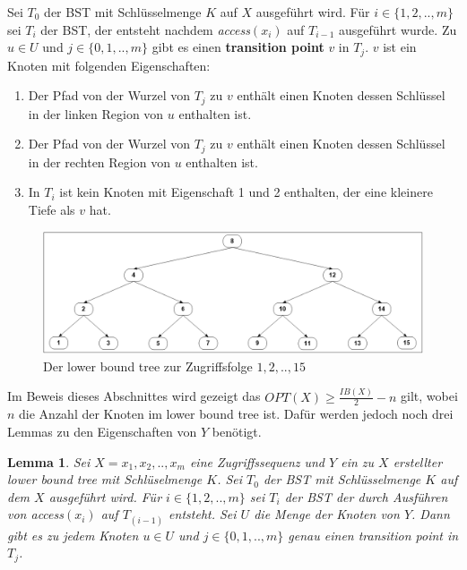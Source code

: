 \documentclass[a4paper,12pt]{article}
\begin{document}
Sei $T_0$ der BST mit Schlüsselmenge $K$ auf $X$ ausgeführt wird. Für $i \in \{1,2,..,m\}$ sei $T_i$ der BST, der entsteht nachdem \textit{access}$\left(x_i\right)$ auf $T_{i-1}$ ausgeführt wurde. Zu $u \in U$ und  $j \in \{0,1,..,m\}$ gibt es einen \textbf{transition point} $v$ in $T_j$. $v$ ist ein Knoten mit folgenden Eigenschaften:\\
\begin{enumerate}
	\item Der Pfad von der Wurzel von $T_j$ zu $v$ enthält einen Knoten dessen Schlüssel in der linken Region von $u$ enthalten ist.
	\item Der Pfad von der Wurzel von $T_j$ zu $v$ enthält einen Knoten dessen Schlüssel in der rechten Region von $u$ enthalten ist.
	\item In $T_i$ ist kein Knoten mit Eigenschaft 1 und 2 enthalten, der eine kleinere Tiefe als $v$ hat. 
\end{enumerate}
 \begin{figure}[h]
 	\centering
 	\includegraphics[width=1\textwidth]{"Medien/Tango/lowerBoundTree"}
 	\caption{Der lower bound tree zur Zugriffsfolge $1 ,2, .., 15$  }
 	\label{fig:demlowerBoundTree}
 \end{figure}

\noindent Im Beweis dieses Abschnittes wird gezeigt das $\mathit{OPT}\left(X\right) \geq \frac{\mathit{IB}\left(X\right)}{2} - n$ gilt, wobei $n$ die Anzahl der Knoten im lower bound tree ist. Dafür werden jedoch noch drei Lemmas zu den Eigenschaften von $Y$ benötigt. 
\newtheorem{Lemma1}{Lemma}[section] 
\begin{Lemma1} \label{demaineLemma1}
Sei $X = x_1,x_2,..,x_m$ eine Zugriffssequenz und $Y$ ein zu $X$ erstellter lower bound tree mit Schlüselmenge $K$. Sei $T_0$ der BST mit Schlüsselmenge $K$ auf dem $X$ ausgeführt wird. Für $i \in \{1,2,..,m\}$ sei $T_i$ der BST der durch Ausführen von \textit{access}$\left(x_i\right)$ auf $T_{\left(i-1\right)}$ entsteht. Sei $U$ die Menge der Knoten von $Y$. Dann gibt es zu jedem Knoten $u \in U$ und $j \in \{0,1,..,m\}$ genau einen transition point in $T_j$. 	
\end{Lemma1}
\end{document}

